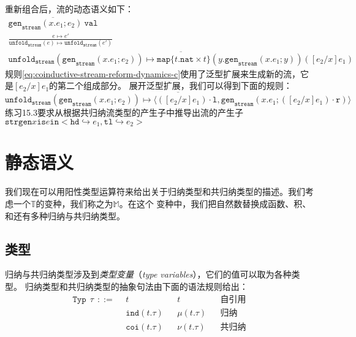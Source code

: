重新组合后，流的动态语义如下：
\begin{subequations}\label{eq:coinductive-stream-reform-dynamics}
	\begin{gather}
	\overline{\texttt{gen}_\texttt{stream}(x.e_1;e_2)\ \texttt{val}} \label{eq:coinductive-stream-reform-dynamics-a}\\
	\frac{e\mapsto e'}{\texttt{unfold}_\texttt{stream}(e)\mapsto\texttt{unfold}_\texttt{stream}(e')} \label{eq:coinductive-stream-reform-dynamics-b}\\
	\overline{\texttt{unfold}_\texttt{stream}(\texttt{gen}_\texttt{stream}(x.e_1;e_2))
	\mapsto \texttt{map}\{t.\texttt{nat}\times t\}(y.\texttt{gen}_\texttt{stream}(x.e_1;y))([e_2/x]e_1)}\label{eq:coinductive-stream-reform-dynamics-c}
	\end{gather}
\end{subequations}
规则\ref{eq:coinductive-stream-reform-dynamics-c}使用了泛型扩展来生成新的流，它是$[e_2/x]e_1$的第二个组成部分。
展开泛型扩展，我们可以得到下面的规则：
$$\overline{\texttt{unfold}_\texttt{stream}(\texttt{gen}_\texttt{stream}(x.e_1;e_2))
\mapsto\langle([e_2/x]e_1)\cdot\texttt{l},\texttt{gen}_\texttt{stream}(x.e_1;([e_2/x]e_1)\cdot\texttt{r})\rangle}$$
练习15.3要求从根据共归纳流类型的产生子中推导出流的产生子$\texttt{strgen}x\texttt{is}e\texttt{in}<\texttt{hd}\hookrightarrow e_1,
\texttt{tl}\hookrightarrow e_2>$

\section{静态语义}

我们现在可以用阳性类型运算符来给出关于归纳类型和共归纳类型的描述。我们考虑一个$\mathbb{T}$的变种，我们称之为$\mathbb{M}$。在这个
变种中，我们把自然数替换成函数、积、和还有多种归纳与共归纳类型。

\subsection{类型}
归纳与共归纳类型涉及到\textit{类型变量}（\textit{type variables}），它们的值可以取为各种类型。
归纳类型和共归纳类型的抽象句法由下面的语法规则给出：
\begin{align*}
	\texttt{Typ}\ \ \tau\ \ ::=\ \ &t & &t & &\text{自引用} \\
	&\texttt{ind}(t.\tau) & &\mu(t.\tau) & &\text{归纳} \\
	&\texttt{coi}(t.\tau) & &\nu(t.\tau) & &\text{共归纳}
\end{align*}


